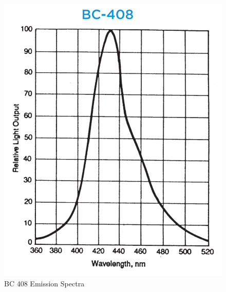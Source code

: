             \begin{figure}[H]
    			\centering
    			\includegraphics[width=12cm]{CLAS-12/modules/clas-12-system/pics/fd/sample-BC-408-emission-spectra.PNG}
    			\caption{BC 408 Emission Spectra}
			\end{figure}
			
            						
									

